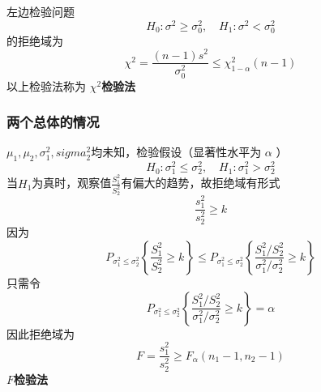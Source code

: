 \documentclass[11pt]{article}
\begin{document}
左边检验问题
\begin{equation*}
H_0:\sigma^2\ge\sigma_0^2,\quad H_1:\sigma^2<\sigma_0^2
\end{equation*}
的拒绝域为
\begin{equation*}
\chi^2=\frac{(n-1)s^2}{\sigma_0^2}\le\chi_{1-\alpha}^2(n-1)
\end{equation*}
以上检验法称为 \textbf{\(\chi^2\)检验法}
\subsubsection{两个总体的情况}
\label{sec:orga677272}
\(\mu_1,\mu_2,\sigma^2_1,sigma^2_2\)均未知，检验假设（显著性水平为 \(\alpha\) ）
\begin{equation*}
H_0:\sigma_1^2\le\sigma_2^2,\quad H_1:\sigma_1^2>\sigma_2^2
\end{equation*}
当\(H_1\)为真时，观察值\(\frac{S_1^2}{S_2^2}\)有偏大的趋势，故拒绝域有形式
\begin{equation*}
\frac{s_1^2}{s_2^2}\ge k
\end{equation*}
因为
\begin{equation*}
P_{\sigma_1^2\le\sigma_2^2}\left\{\frac{S_1^2}{S_2^2}\ge k\right\}\le
P_{\sigma_1^2\le\sigma_2^2}\left\{\frac{S_1^2/S_2^2}{\sigma_1^2/\sigma_2^2}\ge k\right\}
\end{equation*}
只需令
\begin{equation*}
P_{\sigma_1^2\le\sigma_2^2}\left\{\frac{S_1^2/S_2^2}{\sigma_1^2/\sigma_2^2}\ge k\right\}
=\alpha
\end{equation*}
因此拒绝域为
\begin{equation*}
F=\frac{s_1^2}{s_2^2}\ge F_{\alpha}(n_1-1,n_2-1)
\end{equation*}
\textbf{\(F\)检验法}
\end{document}
